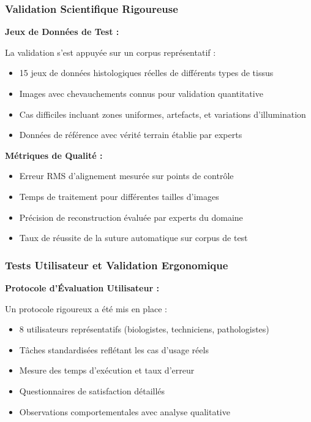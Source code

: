 \documentclass[12pt,a4paper]{article}
\begin{document}
\subsubsection{Validation Scientifique Rigoureuse}

\textbf{Jeux de Données de Test :}

La validation s'est appuyée sur un corpus représentatif :
\begin{itemize}
\item 15 jeux de données histologiques réelles de différents types de tissus
\item Images avec chevauchements connus pour validation quantitative
\item Cas difficiles incluant zones uniformes, artefacts, et variations d'illumination
\item Données de référence avec vérité terrain établie par experts
\end{itemize}

\textbf{Métriques de Qualité :}
\begin{itemize}
\item Erreur RMS d'alignement mesurée sur points de contrôle
\item Temps de traitement pour différentes tailles d'images
\item Précision de reconstruction évaluée par experts du domaine
\item Taux de réussite de la suture automatique sur corpus de test
\end{itemize}

\subsubsection{Tests Utilisateur et Validation Ergonomique}

\textbf{Protocole d'Évaluation Utilisateur :}

Un protocole rigoureux a été mis en place :
\begin{itemize}
\item 8 utilisateurs représentatifs (biologistes, techniciens, pathologistes)
\item Tâches standardisées reflétant les cas d'usage réels
\item Mesure des temps d'exécution et taux d'erreur
\item Questionnaires de satisfaction détaillés
\item Observations comportementales avec analyse qualitative
\end{itemize}
\end{document}
